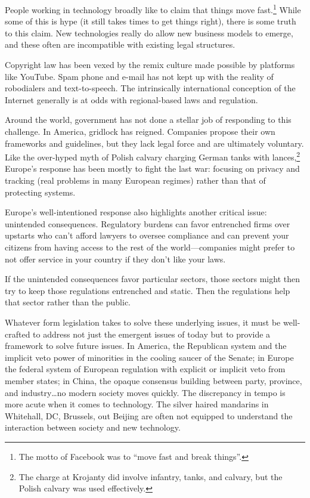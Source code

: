 People working in technology broadly like to claim that things move
fast.\footnote{The motto of Facebook was to ``move fast and break
  things''.}  While some of this is hype (it still takes times to get
things right), there is some truth to this claim.  New technologies
really do allow new business models to emerge, and these often are
incompatible with existing legal structures.

Copyright law has been vexed by the remix culture made possible by
platforms like YouTube.  Spam phone and e-mail has not kept up with
the reality of robodialers and text-to-speech.  The intrinsically
international conception of the Internet generally is at odds with
regional-based laws and regulation.

Around the world, government has not done a stellar job of responding
to this challenge.  In America, gridlock has reigned.  Companies
propose their own frameworks and guidelines, but they lack legal force
and are ultimately voluntary.  Like the over-hyped myth of Polish
calvary charging German tanks with lances,\footnote{The charge at
  Krojanty did involve infantry, tanks, and calvary, but the Polish
  calvary was used effectively.} Europe's response has been mostly to
fight the last war: focusing on privacy and tracking (real problems in
many European regimes) rather than that of protecting systems.

Europe's well-intentioned  response also highlights another
critical issue: unintended consequences.  Regulatory burdens can favor
entrenched firms over upstarts who can't afford lawyers to oversee
compliance and can prevent your citizens from having access to the
rest of the world---companies might prefer to not offer service in
your country if they don't like your laws.

If the unintended consequences favor particular sectors, those sectors
might then try to keep those regulations entrenched and static.  Then
the regulations help that sector rather than the public.

Whatever form legislation takes to solve these underlying issues, it must be well-crafted to address not just the emergent issues of today but to provide a framework to solve future issues.  In America, the Republican system and the implicit veto power of minorities in the cooling saucer of the Senate; in Europe the federal system of European regulation with explicit or implicit veto from member states; in China, the opaque consensus building between party, province, and industry\dots no modern society moves quickly.  
The discrepancy in tempo is more acute when it comes to technology.
The silver haired mandarins in Whitehall, DC, Brussels, out Beijing are often not equipped to understand the interaction between society and new technology.

